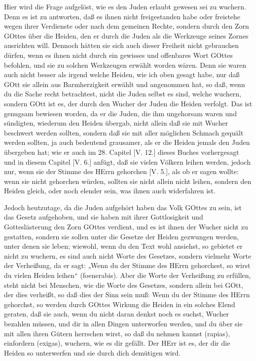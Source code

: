 Hier wird die Frage aufgelöst, wie es den Juden erlaubt gewesen sei zu wuchern. Denn es ist zu antworten, daß es ihnen nicht freigestanden habe oder freistehe wegen ihrer Verdienste oder nach dem gemeinen Rechte, sondern durch den Zorn GOttes über die Heiden, den er durch die Juden als die Werkzeuge seines Zornes ausrichten will. Dennoch hätten sie sich auch dieser Freiheit nicht gebrauchen dürfen, wenn es ihnen nicht durch ein gewisses und offenbares Wort GOttes befohlen, und sie zu solchen Werkzeugen erwählt worden wären. Denn sie waren auch nicht besser als irgend welche Heiden, wie ich oben gesagt habe, nur daß GOtt sie allein aus Barmherzigkeit erwählt und angenommen hat, so daß, wenn du die Sache recht betrachtest, nicht die Juden selbst es sind, welche wuchern, sondern GOtt ist es, der durch den Wucher der Juden die Heiden verfolgt. Das ist genugsam bewiesen worden, da er die Juden, die ihm ungehorsam waren und sündigten, wiederum den Heiden übergab, nicht allein daß sie mit Wucher beschwert werden sollten, sondern daß sie mit aller möglichen Schmach gequält werden sollten, ja auch bedeutend grausamer, als er die Heiden jemals den Juden übergeben hat; wie er auch im 28. Capitel [V. 12.] dieses Buches vorhergesagt und in diesem Capitel [V. 6.] anfügt, daß sie vielen Völkern leihen werden, jedoch nur, wenn sie der Stimme des HErrn gehorchen [V. 5.], als ob er sagen wollte: wenn sie nicht gehorchen würden, sollten sie nicht allein nicht leihen, sondern den Heiden gleich, oder noch elender sein, was ihnen auch widerfahren ist.

Jedoch heutzutage, da die Juden aufgehört haben das Volk GOttes zu sein, ist das Gesetz aufgehoben, und sie haben mit ihrer Gottlosigkeit
und Gotteslästerung den Zorn GOttes verdient, und es ist ihnen der Wucher nicht zu gestatten, sondern sie sollen unter die Gesetze der Heiden gezwungen werden, unter denen sie leben; wiewohl, wenn du den Text wohl ansiehst, so gebietet er nicht zu wuchern, es sind auch nicht Worte des Gesetzes, sondern vielmehr Worte der Verheißung, da er sagt: „Wenn du der Stimme des HErrn gehorchest, so wirst du vielen Heiden leihen“ (foenerabis). Aber die Worte der Verheißung zu erfüllen, steht nicht bei Menschen, wie die Worte des Gesetzes, sondern allein bei GOtt, der dies verheißt, so daß dies der Sinn sein muß: Wenn du der Stimme des HErrn gehorchst, so werden durch GOttes Wirkung die Heiden in ein solches Elend geraten, daß sie auch, wenn du nicht daran denkst noch es suchst, Wucher bezahlen müssen, und dir in allen Dingen unterworfen werden, und du über sie mit allen ihren Gütern herrschen wirst, so daß du nehmen kannst (rapias), einfordern (exigas), wuchern, wie es dir gefällt. Der HErr ist es, der dir die Heiden so unterwerfen und sie durch dich demütigen wird.

